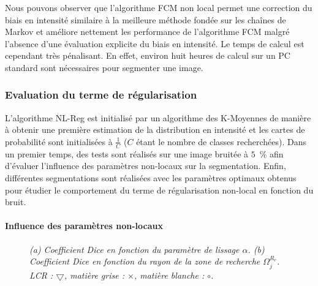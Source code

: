 Nous pouvons observer que l'algorithme FCM non local permet une correction du biais en intensité similaire à la meilleure méthode fondée sur les chaînes de Markov et améliore nettement les performance de l'algorithme FCM malgré l'absence d'une évaluation explicite du biais en intensité.
Le temps de calcul est cependant très pénalisant.
En effet, environ huit heures de calcul sur un PC standard sont nécessaires pour segmenter une image.

\subsubsection{Evaluation du terme de régularisation}
\label{sec:brainweb:nlReg}

L'algorithme NL-Reg est initialisé par un algorithme des K-Moyennes de manière à obtenir une première estimation de la distribution en intensité et les cartes de probabilité sont initialisées à $\frac{1}{C}$ ($C$ étant le nombre de classes recherchées).
Dans un premier temps, des tests sont réalisés sur une image bruitée à $5$~\% afin d'évaluer l'influence des paramètres non-locaux sur la segmentation.
Enfin, différentes segmentations sont réalisées avec les paramètres optimaux obtenus pour étudier le comportement du terme de régularisation non-local en fonction du bruit.

\paragraph*{Influence des paramètres non-locaux}

\begin{figure}[!thbp]

        \begin{center}
        \end{center}
        
        \caption{\emph{(a) Coefficient Dice en fonction du paramètre de lissage $\alpha$. (b) Coefficient Dice en fonction du rayon de la zone de recherche $\Omega^{R_{r}}_{j}$. LCR : $\bigtriangledown$, matière grise : $\times$, matière blanche : $\circ$.}}
        
        \label{FIG:PARAM:BRAINWEB:NOISE}

\end{figure}

